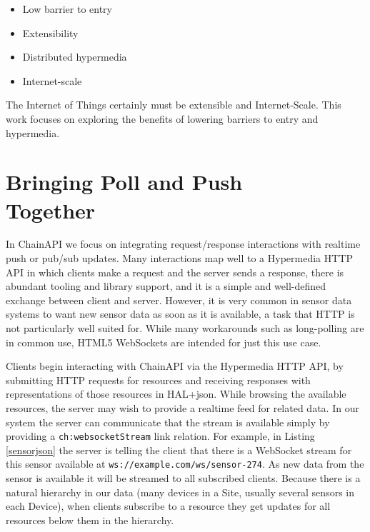 \documentclass{acm_proc_article-sp}
\newenvironment{tightitemize}{
    \vspace{-10pt}
    \begin{itemize}
        \setlength{\parskip}{-1pt}}{
    \end{itemize}
    \vspace{-10pt}}
\begin{document}
\begin{tightitemize}
    \item Low barrier to entry
    \item Extensibility
    \item Distributed hypermedia
    \item Internet-scale
\end{tightitemize}

The Internet of Things certainly must be extensible and Internet-Scale. This work
focuses on exploring the benefits of lowering barriers to entry and hypermedia.

\section{Bringing Poll and Push\\ Together}

In ChainAPI we focus on integrating request/response interactions with realtime
push or pub/sub updates. Many interactions map well to a Hypermedia HTTP API in
which clients make a request and the server sends a response, there is abundant
tooling and library support, and it is a simple and well-defined exchange
between client and server. However, it is very common in sensor data systems to
want new sensor data as soon as it is available, a task that HTTP is not
particularly well suited for. While many workarounds such as long-polling are
in common use, HTML5 WebSockets are intended for just this use case.

Clients begin interacting with ChainAPI via the Hypermedia HTTP API, by submitting
HTTP requests for resources and receiving responses with representations of
those resources in HAL+json. While browsing the available resources, the server
may wish to provide a realtime feed for related data. In our system the server
can communicate that the stream is available simply by providing a
\texttt{ch:websocketStream} link relation. For example, in Listing
\ref{sensorjson} the server is telling the client that there is a WebSocket
stream for this sensor available at \texttt{ws://example.com/ws/sensor-274}. As
new data from the sensor is available it will be streamed to all subscribed
clients. Because there is a natural hierarchy in our data (many devices in a
Site, usually several sensors in each Device), when clients subscribe to a resource
they get updates for all resources below them in the hierarchy.
\end{document}
